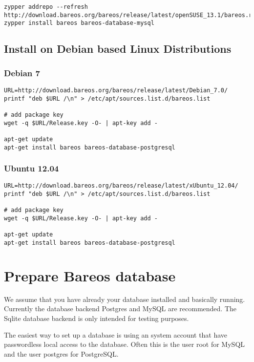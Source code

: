 \begin{verbatim}
zypper addrepo --refresh http://download.bareos.org/bareos/release/latest/openSUSE_13.1/bareos.repo
zypper install bareos bareos-database-mysql
\end{verbatim}


\subsection{Install on Debian based Linux Distributions}


\subsubsection{Debian 7}

\begin{verbatim}
URL=http://download.bareos.org/bareos/release/latest/Debian_7.0/
printf "deb $URL /\n" > /etc/apt/sources.list.d/bareos.list

# add package key
wget -q $URL/Release.key -O- | apt-key add -

apt-get update
apt-get install bareos bareos-database-postgresql
\end{verbatim}

\subsubsection{Ubuntu 12.04}

\begin{verbatim}
URL=http://download.bareos.org/bareos/release/latest/xUbuntu_12.04/
printf "deb $URL /\n" > /etc/apt/sources.list.d/bareos.list

# add package key
wget -q $URL/Release.key -O- | apt-key add -

apt-get update
apt-get install bareos bareos-database-postgresql
\end{verbatim}

\section{Prepare Bareos database}
    \label{CreateDatabase}

We assume that you have already your database installed and basically running.
Currently the database backend Postgres and MySQL are recommended. The Sqlite database backend is only intended for testing purposes.

The easiest way to set up a database is using an system account that have passwordless local access to the database. 
Often this is the user root for MySQL and the user postgres for PostgreSQL.

